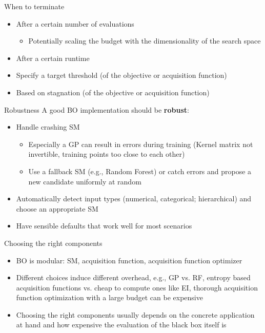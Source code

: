 \documentclass[11pt,compress,t,notes=noshow, xcolor=table]{beamer}
\begin{document}
\begin{frame}{When to terminate}
  \begin{itemize}
    \item After a certain number of evaluations
      \begin{itemize}
        \item Potentially scaling the budget with the dimensionality of the search space
       \end{itemize}
    \item After a certain runtime
    \item Specify a target threshold (of the objective or acquisition function)
    \item Based on stagnation (of the objective or acquisition function)
  \end{itemize}
\end{frame}

\begin{frame}{Robustness}
A good BO implementation should be \textbf{robust}:\\
\vspace{1em}
\begin{itemize}
  \item Handle crashing SM
  \begin{itemize}
    \item Especially a GP can result in errors during training (Kernel matrix not invertible, training points too close to each other)
    \item Use a fallback SM (e.g., Random Forest) or catch errors and propose a new candidate uniformly at random
  \end{itemize}
  \item Automatically detect input types (numerical, categorical; hierarchical) and choose an appropriate SM
  \item Have sensible defaults that work well for most scenarios
\end{itemize}
\end{frame}

\begin{frame}{Choosing the right components}
\begin{itemize}
\item BO is modular: SM, acquisition function, acquisition function optimizer
\item Different choices induce different overhead, e.g., GP vs. RF, entropy based acquisition functions vs. cheap to compute ones like EI, thorough acquisition function optimization with a large budget can be expensive
\item Choosing the right components usually depends on the concrete application at hand and how expensive the evaluation of the black box itself is
\end{itemize}

\end{frame}

\endlecture
\end{document}

